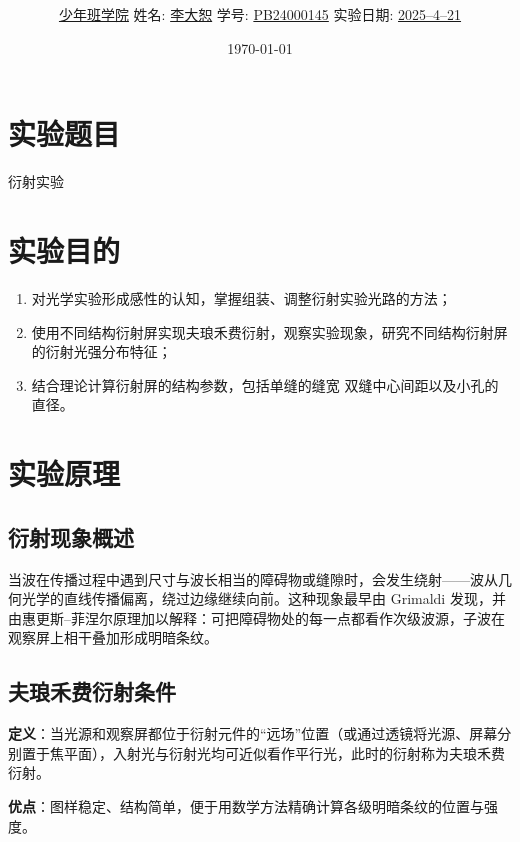 \documentclass[12pt,a4paper]{article}
\title{\Huge{\textbf{\uuline{实\ 验\ 报\ 告}}}}
\author{\uline{少年班学院} \quad 姓名: \uline{李大恕} \quad 学号: \uline{PB24000145} \quad 实验日期: \uline{2025--4--21}}
\date{\today}
\begin{document}
\maketitle

\section{实验题目}
	衍射实验

\section{实验目的}
    \begin{enumerate}
        \item 对光学实验形成感性的认知，掌握组装、调整衍射实验光路的方法；
        \item 使用不同结构衍射屏实现夫琅禾费衍射，观察实验现象，研究不同结构衍射屏的衍射光强分布特征；
        \item 结合理论计算衍射屏的结构参数，包括单缝的缝宽 双缝中心间距以及小孔的直径。
    \end{enumerate}

\section{实验原理}
    \subsection{衍射现象概述}
    当波在传播过程中遇到尺寸与波长相当的障碍物或缝隙时，会发生绕射——波从几何光学的直线传播偏离，绕过边缘继续向前。这种现象最早由 Grimaldi 发现，并由惠更斯–菲涅尔原理加以解释：可把障碍物处的每一点都看作次级波源，子波在观察屏上相干叠加形成明暗条纹。

    \subsection{夫琅禾费衍射条件}
        \textbf{定义}：当光源和观察屏都位于衍射元件的“远场”位置（或通过透镜将光源、屏幕分别置于焦平面），入射光与衍射光均可近似看作平行光，此时的衍射称为夫琅禾费衍射。

        \textbf{优点}：图样稳定、结构简单，便于用数学方法精确计算各级明暗条纹的位置与强度。
\end{document}
